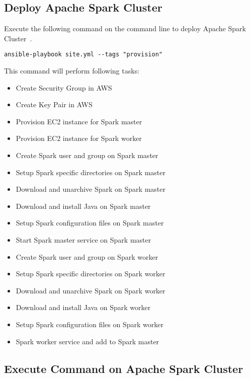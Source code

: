 \subsection{Deploy Apache Spark Cluster}

Execute the following command on the command line to deploy Apache
Spark Cluster~\cite{hid-sp18-511-www-spark}.

\begin{verbatim}
ansible-playbook site.yml --tags "provision"
\end{verbatim}

This command will perform following tasks:

\begin{itemize}
	\item Create Security Group in AWS
	\item Create Key Pair in AWS
	\item Provision EC2 instance for Spark master
	\item Provision EC2 instance for Spark worker
	\item Create Spark user and group on Spark master
	\item Setup Spark specific directories on Spark master
	\item Download and unarchive Spark on Spark master
	\item Download and install Java on Spark master
	\item Setup Spark configuration files on Spark master
	\item Start Spark master service on Spark master
	\item Create Spark user and group on Spark worker
	\item Setup Spark specific directories on Spark worker
	\item Download and unarchive Spark  on Spark worker
	\item Download and install Java  on Spark worker
	\item Setup Spark configuration files on Spark worker
	\item Spark worker service and add to Spark master	
\end{itemize}

\subsection{Execute Command on Apache Spark Cluster}


